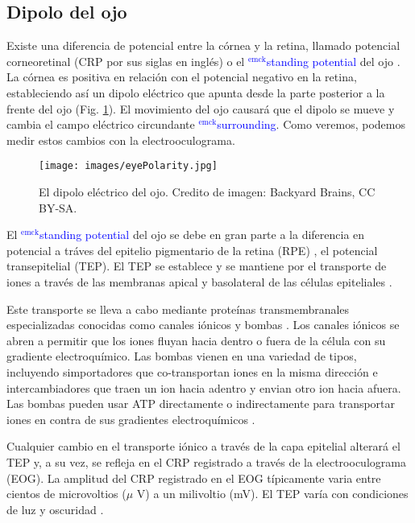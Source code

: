 \documentclass[12pt]{article}
\newcommand{\emck}[1]{\textcolor{blue}{$^{\textrm{emck}}${#1}}}
\begin{document}
\subsection*{Dipolo del ojo}
Existe una diferencia de potencial entre la córnea y la retina,
llamado potencial corneoretinal (CRP por sus siglas en inglés) o el
\emck{standing potential} del ojo
\cite{heide1999electrooculography,marg1951development,malmivuo1995bioelectromagnetism}. La
córnea es positiva en relación con el potencial negativo en la retina,
estableciendo así un dipolo eléctrico que apunta desde la parte
posterior a la frente del ojo (Fig. \ref{fig:crp}). El movimiento del
ojo causará que el dipolo se mueve y cambia el campo eléctrico
circundante \emck{surrounding}. Como veremos, podemos medir estos
cambios con la electrooculograma.

\begin{figure}[h!]
\centering
\texttt{[image: images/eyePolarity.jpg]}
\caption{El dipolo eléctrico del ojo. Credito de imagen: Backyard
  Brains, CC BY-SA.}
\label{fig:crp}
\end{figure}

El \emck{standing potential} del ojo se debe en gran parte a la
diferencia en potencial a tráves del epitelio pigmentario de la retina
(RPE) \cite{heide1999electrooculography,berg1991dipole}, el potencial
transepitelial (TEP). El TEP se establece y se mantiene por el
transporte de iones a través de las membranas apical y basolateral de
las células epiteliales \cite{joseph1991apical,quinn1992ion}.

Este transporte se lleva a cabo mediante proteínas transmembranales
especializadas conocidas como canales iónicos y bombas
\cite{khanTransport}. Los canales iónicos se abren a permitir que los
iones fluyan hacia dentro o fuera de la célula con su gradiente
electroquímico. Las bombas vienen en una variedad de tipos, incluyendo
simportadores que co-transportan iones en la misma dirección e
intercambiadores que traen un ion hacia adentro y envian otro ion
hacia afuera. Las bombas pueden usar ATP directamente o indirectamente
para transportar iones en contra de sus gradientes electroquímicos
\cite{khanTransport}.

Cualquier cambio en el transporte iónico a través de la capa epitelial
alterará el TEP y, a su vez, se refleja en el CRP registrado a través
de la electrooculograma (EOG). La amplitud del CRP registrado en el
EOG típicamente varia entre cientos de microvoltios ($\mu$ V) a un
milivoltio (mV). El TEP varía con condiciones de luz y oscuridad
\cite{heide1999electrooculography}.
\end{document}
